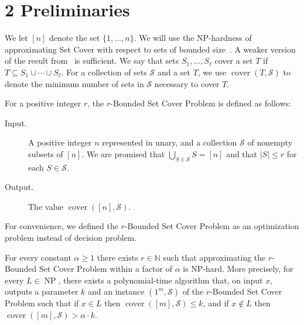 \section*{2 Preliminaries}
We let $[n]$ denote the set $\{1,\ldots,n\}$. We will use the NP-hardness of approximating Set Cover with respect to sets of bounded size~\cite{ref76}. A weaker version of the result from~\cite{ref76} is sufficient.
We say that sets $S_1,\ldots,S_\ell$ cover a set $T$ if $T\subseteq S_1\cup\cdots\cup S_\ell$. For a collection of sets $\mathcal S$ and a set $T$, we use $\operatorname{cover}(T,\mathcal S)$ to denote the minimum number of sets in $\mathcal S$ necessary to cover $T$.
\setcounter{nttheorem}{6}
\begin{ntdefinition}
For a positive integer $r$, the $r$-Bounded Set Cover Problem is defined as follows:
\begin{description}
\item[Input.] A positive integer $n$ represented in unary, and a collection $\mathcal S$ of nonempty subsets of $[n]$. We are promised that $\bigcup_{S\in\mathcal S}S=[n]$ and that $|S|\leq r$ for each $S\in\mathcal S$.
\item[Output.] The value $\operatorname{cover}([n],\mathcal S)$.
\end{description}
\end{ntdefinition}
For convenience, we defined the $r$-Bounded Set Cover Problem as an optimization problem instead of decision problem.
\begin{nttheorem}
For every constant $\alpha\geq1$ there exists $r\in\mathbb N$ such that approximating the $r$-Bounded Set Cover Problem within a factor of $\alpha$ is NP-hard. More precisely, for every $L\in\operatorname{NP}$, there exists a polynomial-time algorithm that, on input $x$, outputs a parameter $k$ and an instance $(1^m,\mathcal S)$ of the $r$-Bounded Set Cover Problem such that if $x\in L$ then $\operatorname{cover}([m],\mathcal S)\leq k$, and if $x\notin L$ then $\operatorname{cover}([m],\mathcal S)>\alpha\cdot k$.
\end{nttheorem}
